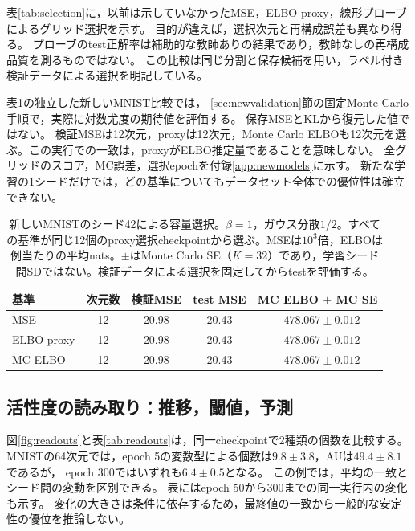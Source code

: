 \documentclass[11pt,a4paper]{ltjsarticle}
\begin{document}
表\ref{tab:selection}に，以前は示していなかったMSE，ELBO proxy，線形プローブによるグリッド選択を示す。
目的が違えば，選択次元と再構成誤差も異なり得る。
プローブのtest正解率は補助的な教師ありの結果であり，教師なしの再構成品質を測るものではない。
この比較は同じ分割と保存候補を用い，ラベル付き検証データによる選択を明記している。

表\ref{tab:mcselection}の独立した新しいMNIST比較では，
\ref{sec:newvalidation}節の固定Monte Carlo手順で，実際に対数尤度の期待値を評価する。
保存MSEとKLから復元した値ではない。
検証MSEは12次元，proxyは12次元，Monte Carlo ELBOも12次元を選ぶ。この実行での一致は，proxyがELBO推定量であることを意味しない。
全グリッドのスコア，MC誤差，選択epochを付録\ref{app:newmodels}に示す。
新たな学習の1シードだけでは，どの基準についてもデータセット全体での優位性は確立できない。

\begin{table}[H]
\caption{新しいMNISTのシード42による容量選択。$\beta=1$，ガウス分散$1/2$。すべての基準が同じ12個のproxy選択checkpointから選ぶ。MSEは$10^3$倍，ELBOは例当たりの平均nats。$\pm$はMonte Carlo SE（$K=32$）であり，学習シード間SDではない。検証データによる選択を固定してからtestを評価する。}\label{tab:mcselection}
\small
\setlength{\tabcolsep}{3pt}
\begin{tabular*}{\textwidth}{@{\extracolsep{\fill}}lcccc@{}}
\toprule
基準 & 次元数 & 検証MSE & test MSE & MC ELBO $\pm$ MC SE \\
\midrule
MSE & 12 & 20.98 & 20.43 & $-478.067 \pm 0.012$ \\
ELBO proxy & 12 & 20.98 & 20.43 & $-478.067 \pm 0.012$ \\
MC ELBO & 12 & 20.98 & 20.43 & $-478.067 \pm 0.012$ \\
\bottomrule\end{tabular*}
\end{table}

\subsection{活性度の読み取り：推移，閾値，予測}\label{sec:au}
図\ref{fig:readouts}と表\ref{tab:readouts}は，同一checkpointで2種類の個数を比較する。
MNISTの64次元では，epoch 5の変数型による個数は$9.8\pm3.8$，AUは$49.4\pm8.1$であるが，
epoch 300ではいずれも$6.4\pm0.5$となる。
この例では，平均の一致とシード間の変動を区別できる。
表にはepoch 50から300までの同一実行内の変化も示す。
変化の大きさは条件に依存するため，最終値の一致から一般的な安定性の優位を推論しない。
\end{document}
